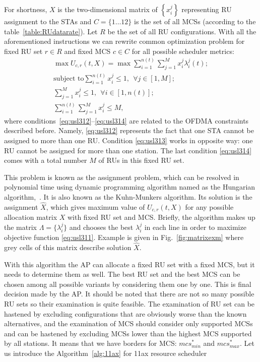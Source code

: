 For shortness, $X$ is the two-dimensional matrix of $\left\{x_i^j\right\}$ representing RU assignment to the STAs and $C = \{1\dots12\}$ is the set of all MCSs (according to the table~\ref{table:RUdatarate}). Let $R$ be the set of all RU configurations. With all the aforementioned instructions we can rewrite common optimization problem for fixed RU set $r \in R$ and fixed MCS $c \in C$ for all possible scheduler metrics:
\begin{align} \label{eq:usl311}
\max U_{c, r}(t,X) = \max \sum^{n(t)}_{i = 1} \sum_{j = 1}^{M} x_i^j \lambda_i^j(t); \\ \label{eq:usl312}
\text{subject to} \sum_{i=1}^{n(t)} x_i^j \leq 1,\ \  \forall j \in [1,M]; \\ \label{eq:usl313}
\sum_{j = 1}^{M} x_i^j \leq 1, \ \ \forall i \in [1, n(t)]; \\ \label{eq:usl314}
\sum_{i = 1}^{n(t)} \sum_{j = 1}^{M} x_i^j \leq M,
\end{align}
where conditions~\eqref{eq:usl312}--\eqref{eq:usl314} are related to the OFDMA  constraints described before. 
Namely, \eqref{eq:usl312} represents the fact that one STA cannot be assigned to more than one RU. Condition \eqref{eq:usl313} works in opposite way: one RU cannot be assigned for more than one station. The last condition \eqref{eq:usl314} comes with a total number $M$ of RUs in this fixed RU set.

This problem is known as the assignment problem, which can be resolved in polynomial time using dynamic programming algorithm named as the Hungarian algorithm,~\cite{bourgeois1971extension}.
It is also known as the Kuhn-Munkers algorithm. 
Its solution is the assignment $\hat X$, which gives maximum value of $U_{c, r}(t,X)$  for any possible allocation matrix $X$ with fixed RU set and MCS. 
Briefly, the algorithm makes up the matrix $\Lambda = \{\lambda_i^j\}$ and chooses the best $\lambda_i^j$ in each line in order to maximize objective function \ref{eq:usl311}. Example is given in Fig.~\ref{fig:matrixexm} where grey cells of this matrix describe solution $\hat X$. 

With this algorithm the AP can allocate a fixed RU set with a fixed MCS, but it needs to determine them as well. The best RU set and the best MCS can be chosen among all possible variants by considering them one by one. This is final decision made by the AP. 
It should be noted that there are not so many possible RU sets so their examination is quite feasible.
The examination of RU set can be hastened by excluding configurations that are obviously worse than the known alternatives, and the examination of MCS should consider only supported MCSs and can be hastened by excluding MCSs lower than the highest MCS supported by all stations. It means that we have borders for MCS: $mcs^{*}_{min}$ and $mcs^{*}_{max}$. Let us introduce the Algorithm~\ref{alg:11ax} for 11ax resource scheduler 

